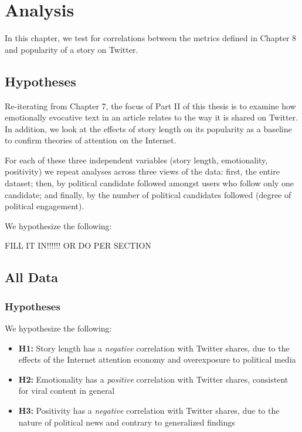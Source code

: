 
\chapter{Analysis}
In this chapter, we test for correlations between the metrics defined in Chapter 8 and popularity of a story on Twitter.

\section{Hypotheses}
Re-iterating from Chapter 7, the focus of Part II of this thesis is to examine how emotionally evocative text in an article relates to the way it is shared on Twitter. In addition, we look at the effects of story length on its popularity as a baseline to confirm theories of attention on the Internet.

For each of these three independent variables (story length, emotionality, positivity) we repeat analyses across three views of the data: first, the entire dataset; then, by political candidate followed amongst users who follow only one candidate; and finally, by the number of political candidates followed (degree of political engagement).

We hypothesize the following:

 FILL IT IN!!!!!! OR DO PER SECTION


\section{All Data}
\subsection{Hypotheses}
We hypothesize the following:

\begin{itemize} 
    \item \textbf{H1:} Story length has a \emph{negative} correlation with Twitter shares, due to the effects of the Internet attention economy and overexposure to political media \cite{goldhaber1997attention}
    \item \textbf{H2:} Emotionality has a \emph{positive} correlation with Twitter shares, consistent for viral content in general \cite{berger2012makes}
    \item \textbf{H3:} Positivity has a \emph{negative} correlation with Twitter shares, due to the nature of political news and contrary to generalized findings \cite{berger2012makes}

\end{itemize}

